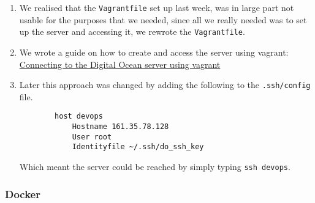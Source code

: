 \begin{enumerate}
    \item We realised that the \texttt{Vagrantfile} set up last week, was in large part not usable for the purposes that we needed, since all we really needed was to set up the server and accessing it, we rewrote the \texttt{Vagrantfile}.
    \item We wrote a guide on how to create and access the server using vagrant: \href{https://www.notion.so/Connecting-to-the-Digital-Ocean-server-using-vagrant-5b8564d3a0fd40bdbc2c326705f1f8dc?pvs=21}{Connecting to the Digital Ocean server using vagrant}
    \item Later this approach was changed by adding the following to the \texttt{.ssh/config} file.

    \begin{verbatim}
        host devops
            Hostname 161.35.78.128
            User root
            Identityfile ~/.ssh/do_ssh_key
    \end{verbatim}
    Which meant the server could be reached by simply typing \texttt{ssh\ devops}.
\end{enumerate}

\subsubsection{Docker}
\label{log:docker}

